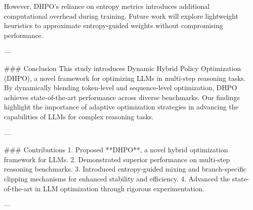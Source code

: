 However, DHPO's reliance on entropy metrics introduces additional computational overhead during training. Future work will explore lightweight heuristics to approximate entropy-guided weights without compromising performance.

---

### Conclusion  
This study introduces Dynamic Hybrid Policy Optimization (DHPO), a novel framework for optimizing LLMs in multi-step reasoning tasks. By dynamically blending token-level and sequence-level optimization, DHPO achieves state-of-the-art performance across diverse benchmarks. Our findings highlight the importance of adaptive optimization strategies in advancing the capabilities of LLMs for complex reasoning tasks.

---

### Contributions  
1. Proposed **DHPO**, a novel hybrid optimization framework for LLMs.  
2. Demonstrated superior performance on multi-step reasoning benchmarks.  
3. Introduced entropy-guided mixing and branch-specific clipping mechanisms for enhanced stability and efficiency.  
4. Advanced the state-of-the-art in LLM optimization through rigorous experimentation.

---